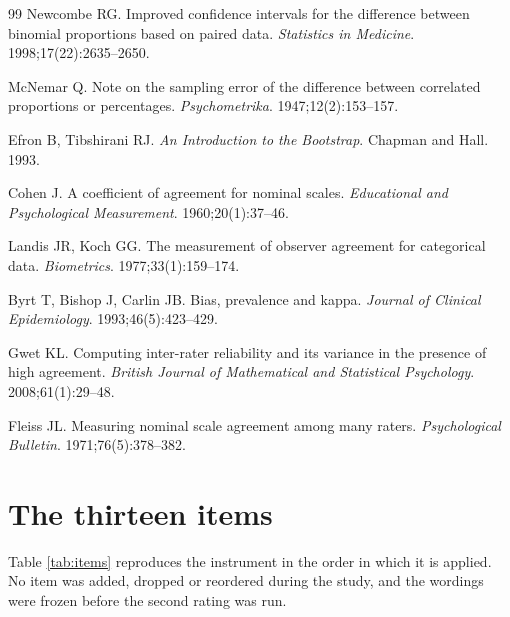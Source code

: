 \documentclass{article}
\begin{document}
\begin{thebibliography}{99}
 Newcombe RG. Improved confidence intervals for the difference between
binomial proportions based on paired data. \emph{Statistics in Medicine}. 1998;17(22):2635--2650.

 McNemar Q. Note on the sampling error of the difference between correlated
proportions or percentages. \emph{Psychometrika}. 1947;12(2):153--157.

 Efron B, Tibshirani RJ. \emph{An Introduction to the Bootstrap}. Chapman and
Hall. 1993.

 Cohen J. A coefficient of agreement for nominal scales. \emph{Educational and
Psychological Measurement}. 1960;20(1):37--46.

 Landis JR, Koch GG. The measurement of observer agreement for categorical
data. \emph{Biometrics}. 1977;33(1):159--174.

 Byrt T, Bishop J, Carlin JB. Bias, prevalence and kappa. \emph{Journal of
Clinical Epidemiology}. 1993;46(5):423--429.

 Gwet KL. Computing inter-rater reliability and its variance in the presence of
high agreement. \emph{British Journal of Mathematical and Statistical Psychology}.
2008;61(1):29--48.

 Fleiss JL. Measuring nominal scale agreement among many raters.
\emph{Psychological Bulletin}. 1971;76(5):378--382.

\end{thebibliography}

\appendix

\section{The thirteen items}
\label{app:items}

Table \ref{tab:items} reproduces the instrument in the order in which it is applied. No item was
added, dropped or reordered during the study, and the wordings were frozen before the second rating
was run.
\end{document}
